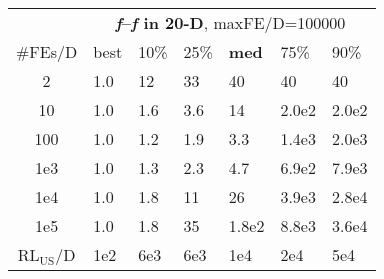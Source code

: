 \begin{tabular}{c|llllll}
 & \multicolumn{6}{|c}{\textbf{\textit{f}\raisebox{-0.35ex}{1}--\textit{f}\raisebox{-0.35ex}{24} in 20-D}, maxFE/D=100000}\\
\#FEs/D & best & 10\% & 25\% & \textbf{med} & 75\% & 90\%\\
2 & \hspace*{1ex}1.0 & 12 & 33 & 40 & 40 & 40\\
10 & \hspace*{1ex}1.0 & \hspace*{1ex}1.6 & \hspace*{1ex}3.6 & 14 & 2.0e2 & 2.0e2\\
100 & \hspace*{1ex}1.0 & \hspace*{1ex}1.2 & \hspace*{1ex}1.9 & \hspace*{1ex}3.3 & 1.4e3 & 2.0e3\\
1e3 & \hspace*{1ex}1.0 & \hspace*{1ex}1.3 & \hspace*{1ex}2.3 & \hspace*{1ex}4.7 & 6.9e2 & 7.9e3\\
1e4 & \hspace*{1ex}1.0 & \hspace*{1ex}1.8 & 11 & 26 & 3.9e3 & 2.8e4\\
1e5 & \hspace*{1ex}1.0 & \hspace*{1ex}1.8 & 35 & 1.8e2 & 8.8e3 & 3.6e4\\
$\text{RL}_{\text{US}}$/D & 1e2 & 6e3 & 6e3 & 1e4 & 2e4 & 5e4
\end{tabular}
